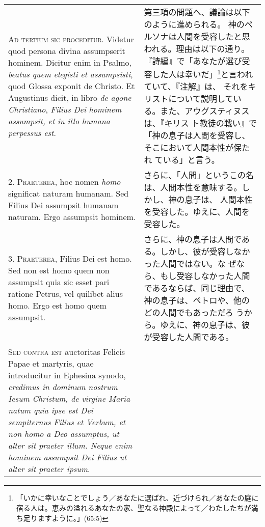 \documentclass[10pt]{jsarticle} %
\begin{document}
\begin{longtable}{p{21em}p{21em}}


{\Huge A}{\scshape d tertium sic proceditur}. Videtur quod persona divina assumpserit
hominem. Dicitur enim in Psalmo, {\itshape beatus quem elegisti et assumpsisti},
quod Glossa exponit de Christo. Et Augustinus dicit, in libro {\itshape de agone
Christiano}, {\itshape Filius Dei hominem assumpsit, et in illo humana perpessus
est}.


&

第三項の問題へ、議論は以下のように進められる。
神のペルソナは人間を受容したと思われる。理由は以下の通り。
『詩編』で「あなたが選び受容した人は幸いだ」\footnote{「いかに幸いなことでしょう／あなたに選ばれ、近づけられ／あなたの庭に宿る人は。恵みの溢れるあなたの家、聖なる神殿によって／わたしたちが満ち足りますように。」(65:5)}と言われていて、『注解』は、
 それをキリストについて説明している。また、アウグスティヌスは、『キリス
 ト教徒の戦い』で「神の息子は人間を受容し、そこにおいて人間本性が保たれ
 ている」と言う。

\\



2. {\scshape Praeterea}, hoc nomen {\itshape homo} significat naturam humanam. Sed Filius Dei
assumpsit humanam naturam. Ergo assumpsit hominem.


&


さらに、「人間」というこの名は、人間本性を意味する。しかし、神の息子は、
 人間本性を受容した。ゆえに、人間を受容した。

\\



3. {\scshape Praeterea}, Filius Dei est homo. Sed non est homo quem non assumpsit quia
sic esset pari ratione Petrus, vel quilibet alius homo. Ergo est homo
quem assumpsit.


&

さらに、神の息子は人間である。しかし、彼が受容しなかった人間ではない。な
 ぜなら、もし受容しなかった人間であるならば、同じ理由で、神の息子は、ペトロや、他のどの人間でもあっただろ
 うから。ゆえに、神の息子は、彼が受容した人間である。

\\



{\scshape Sed contra est} auctoritas Felicis Papae et martyris, quae introducitur
in Ephesina synodo, {\itshape credimus in dominum nostrum Iesum Christum, de
virgine Maria natum quia ipse est Dei sempiternus Filius et Verbum, et
non homo a Deo assumptus, ut alter sit praeter illum. Neque enim hominem
assumpsit Dei Filius ut alter sit praeter ipsum}.



\end{longtable}
\end{document}
